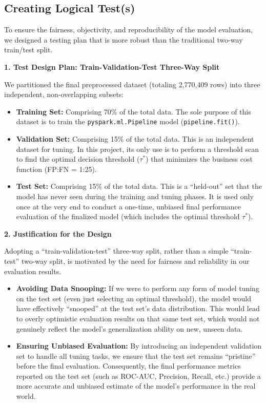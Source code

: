 \documentclass[sigplan,screen]{acmart}
\begin{document}
\subsection{Creating Logical Test(s)}

To ensure the fairness, objectivity, and reproducibility of the model evaluation, we designed a testing plan that is more robust than the traditional two-way train/test split.

\textbf{1. Test Design Plan: Train-Validation-Test Three-Way Split}

We partitioned the final preprocessed dataset (totaling 2,770,409 rows) into three independent, non-overlapping subsets:

\begin{itemize}
\item \textbf{Training Set:} Comprising 70\% of the total data. The sole purpose of this dataset is to train the \texttt{pyspark.ml.Pipeline} model (\texttt{pipeline.fit()}).

\item \textbf{Validation Set:} Comprising 15\% of the total data. This is an independent dataset for tuning. In this project, its only use is to perform a threshold scan to find the optimal decision threshold ($\tau^*$) that minimizes the business cost function (FP:FN = 1:25).

\item \textbf{Test Set:} Comprising 15\% of the total data. This is a ``held-out'' set that the model has never seen during the training and tuning phases. It is used only once at the very end to conduct a one-time, unbiased final performance evaluation of the finalized model (which includes the optimal threshold $\tau^*$).
\end{itemize}

\textbf{2. Justification for the Design}

Adopting a ``train-validation-test'' three-way split, rather than a simple ``train-test'' two-way split, is motivated by the need for fairness and reliability in our evaluation results.

\begin{itemize}
\item \textbf{Avoiding Data Snooping:} If we were to perform any form of model tuning on the test set (even just selecting an optimal threshold), the model would have effectively ``snooped'' at the test set's data distribution. This would lead to overly optimistic evaluation results on that same test set, which would not genuinely reflect the model's generalization ability on new, unseen data.

\item \textbf{Ensuring Unbiased Evaluation:} By introducing an independent validation set to handle all tuning tasks, we ensure that the test set remains ``pristine'' before the final evaluation. Consequently, the final performance metrics reported on the test set (such as ROC-AUC, Precision, Recall, etc.) provide a more accurate and unbiased estimate of the model's performance in the real world.
\end{itemize}
\end{document}
